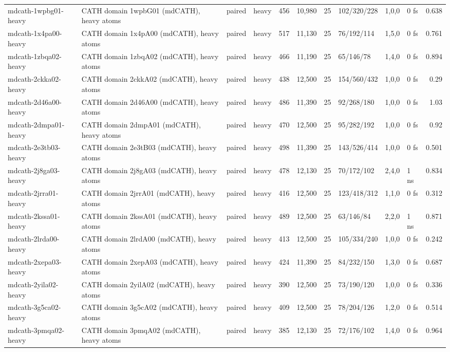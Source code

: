 \documentclass[10pt]{article}
\begin{document}
\begin{small}
\begin{longtable}{p{3.9cm}p{5.2cm}llrrrlrlr}
mdcath-1wpbg01-heavy & CATH domain 1wpbG01 (mdCATH), heavy atoms & paired & heavy & 456 & 10,980 & 25 & 102/320/228 & 1,0,0 & 0 fs & 0.638\\
mdcath-1x4pa00-heavy & CATH domain 1x4pA00 (mdCATH), heavy atoms & paired & heavy & 517 & 11,130 & 25 & 76/192/114 & 1,5,0 & 0 fs & 0.761\\
mdcath-1zbqa02-heavy & CATH domain 1zbqA02 (mdCATH), heavy atoms & paired & heavy & 466 & 11,190 & 25 & 65/146/78 & 1,4,0 & 0 fs & 0.894\\
mdcath-2ckka02-heavy & CATH domain 2ckkA02 (mdCATH), heavy atoms & paired & heavy & 438 & 12,500 & 25 & 154/560/432 & 1,0,0 & 0 fs & 0.29\\
mdcath-2d46a00-heavy & CATH domain 2d46A00 (mdCATH), heavy atoms & paired & heavy & 486 & 11,390 & 25 & 92/268/180 & 1,0,0 & 0 fs & 1.03\\
mdcath-2dmpa01-heavy & CATH domain 2dmpA01 (mdCATH), heavy atoms & paired & heavy & 470 & 12,500 & 25 & 95/282/192 & 1,0,0 & 0 fs & 0.92\\
mdcath-2e3tb03-heavy & CATH domain 2e3tB03 (mdCATH), heavy atoms & paired & heavy & 498 & 11,390 & 25 & 143/526/414 & 1,0,0 & 0 fs & 0.501\\
mdcath-2j8ga03-heavy & CATH domain 2j8gA03 (mdCATH), heavy atoms & paired & heavy & 478 & 12,130 & 25 & 70/172/102 & 2,4,0 & 1 ns & 0.834\\
mdcath-2jrra01-heavy & CATH domain 2jrrA01 (mdCATH), heavy atoms & paired & heavy & 416 & 12,500 & 25 & 123/418/312 & 1,1,0 & 0 fs & 0.312\\
mdcath-2kssa01-heavy & CATH domain 2kssA01 (mdCATH), heavy atoms & paired & heavy & 489 & 12,500 & 25 & 63/146/84 & 2,2,0 & 1 ns & 0.871\\
mdcath-2lrda00-heavy & CATH domain 2lrdA00 (mdCATH), heavy atoms & paired & heavy & 413 & 12,500 & 25 & 105/334/240 & 1,0,0 & 0 fs & 0.242\\
mdcath-2xepa03-heavy & CATH domain 2xepA03 (mdCATH), heavy atoms & paired & heavy & 424 & 11,390 & 25 & 84/232/150 & 1,3,0 & 0 fs & 0.687\\
mdcath-2yila02-heavy & CATH domain 2yilA02 (mdCATH), heavy atoms & paired & heavy & 390 & 12,500 & 25 & 73/190/120 & 1,0,0 & 0 fs & 0.336\\
mdcath-3g5ca02-heavy & CATH domain 3g5cA02 (mdCATH), heavy atoms & paired & heavy & 409 & 12,500 & 25 & 78/204/126 & 1,2,0 & 0 fs & 0.514\\
mdcath-3pmqa02-heavy & CATH domain 3pmqA02 (mdCATH), heavy atoms & paired & heavy & 385 & 12,130 & 25 & 72/176/102 & 1,4,0 & 0 fs & 0.964\\

\end{longtable}
\end{small}
\end{document}

